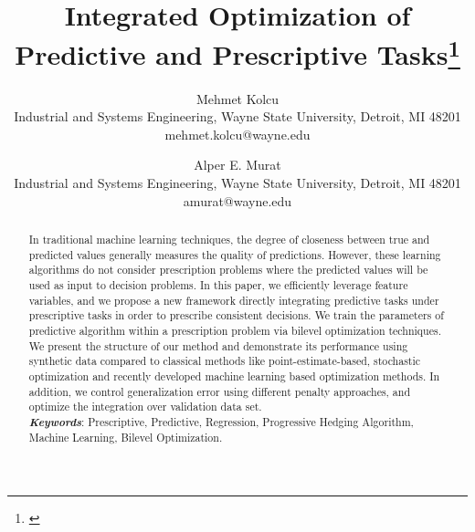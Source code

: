 \documentclass[12pt]{article}
\title{\large \textbf{Integrated Optimization of Predictive and Prescriptive Tasks}\thanks{\href{https://www.abstractsonline.com/pp8/\#!/6818/presentation/11528}{\color{red}{This work was presented in INFORMS Annual Meeting, Seattle, Washington, October 20-23, 2019.}}}}
\author{Mehmet Kolcu\\ 
{\small Industrial and Systems Engineering, Wayne State University, Detroit, MI 48201}\\
{\small mehmet.kolcu@wayne.edu}\\
\and 
Alper E. Murat\\ 
{\small Industrial and Systems Engineering, Wayne State University, Detroit, MI 48201}\\
{\small amurat@wayne.edu}\\
}
\begin{document}
\maketitle
\doublespacing
\begin{abstract}
\noindent In traditional machine learning techniques, the degree of closeness between true and predicted values generally measures the quality of predictions.  However, these learning algorithms do not consider prescription problems where the predicted values will be used as input to decision problems. In this paper, we efficiently leverage feature variables, and we propose a new framework directly integrating predictive tasks under prescriptive tasks in order to prescribe consistent decisions. We train the parameters of predictive algorithm within a prescription problem via bilevel optimization techniques.  We present the structure of our method and demonstrate its performance using synthetic data compared to classical methods like point-estimate-based, stochastic optimization and recently developed machine learning based optimization methods. In addition, we control generalization error using different penalty approaches, and optimize the integration over validation data set.\\
\noindent \textit{\textbf{Keywords}}: Prescriptive, Predictive, Regression, Progressive Hedging Algorithm, Machine Learning, Bilevel Optimization. \\
\end{abstract}
\end{document}
